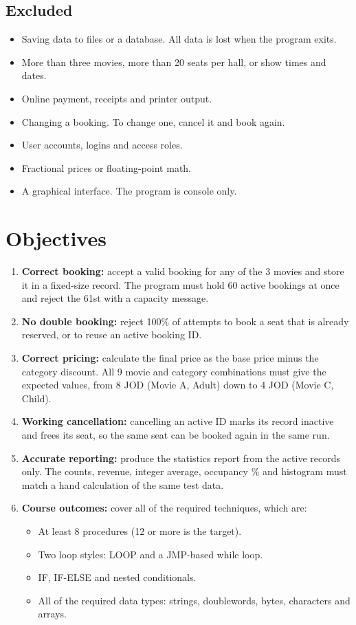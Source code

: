 \documentclass{thesis-library}
\begin{document}
\subsection*{Excluded}
\begin{itemize}
  \item Saving data to files or a database. All data is lost when the program exits.
  \item More than three movies, more than 20 seats per hall, or show times and dates.
  \item Online payment, receipts and printer output.
  \item Changing a booking. To change one, cancel it and book again.
  \item User accounts, logins and access roles.
  \item Fractional prices or floating-point math.
  \item A graphical interface. The program is console only.
\end{itemize}

\section{Objectives}

\begin{enumerate}
  \item \textbf{Correct booking:} accept a valid booking for any of the 3 movies and store it in
        a fixed-size record. The program must hold 60 active bookings at once and reject the
        61st with a capacity message.
  \item \textbf{No double booking:} reject 100\% of attempts to book a seat that is already
        reserved, or to reuse an active booking ID.
  \item \textbf{Correct pricing:} calculate the final price as the base price minus the category
        discount. All 9 movie and category combinations must give the expected values, from
        8 JOD (Movie A, Adult) down to 4 JOD (Movie C, Child).
  \item \textbf{Working cancellation:} cancelling an active ID marks its record inactive and
        frees its seat, so the same seat can be booked again in the same run.
  \item \textbf{Accurate reporting:} produce the statistics report from the active records only.
        The counts, revenue, integer average, occupancy \% and histogram must match a hand
        calculation of the same test data.
  \item \textbf{Course outcomes:} cover all of the required techniques, which are:
  \begin{itemize}
    \item At least 8 procedures (12 or more is the target).
    \item Two loop styles: LOOP and a JMP-based while loop.
    \item IF, IF-ELSE and nested conditionals.
    \item All of the required data types: strings, doublewords, bytes, characters and arrays.
  \end{itemize}
\end{enumerate}
\end{document}
